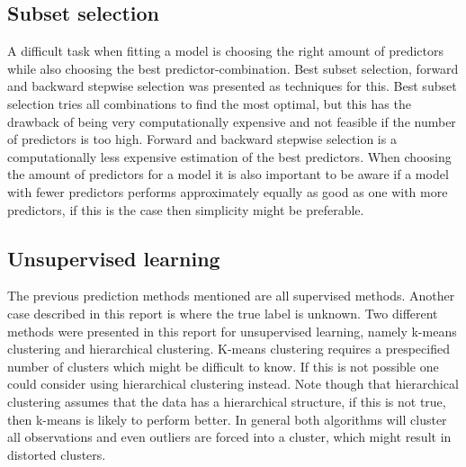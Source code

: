 \subsection{Subset selection}
A difficult task when fitting a model is choosing the right amount of predictors while also choosing the best predictor-combination. Best subset selection, forward and backward stepwise selection was presented as techniques for this. Best subset selection tries all combinations to find the most optimal, but this has the drawback of being very computationally expensive and not feasible if the number of predictors is too high. Forward and backward stepwise selection is a computationally less expensive estimation of the best predictors. When choosing the amount of predictors for a model it is also important to be aware if a model with fewer predictors performs approximately equally as good as one with more predictors, if this is the case then simplicity might be preferable.

\subsection{Unsupervised learning}
The previous prediction methods mentioned are all supervised methods. Another case described in this report is where the true label is unknown. Two different methods were presented in this report for unsupervised learning, namely k-means clustering and hierarchical clustering. K-means clustering requires a prespecified  number of clusters which might be difficult to know. If this is not possible one could consider using hierarchical clustering instead. Note though that hierarchical clustering assumes that the data has a hierarchical structure, if this is not true, then k-means is likely to perform better. In general both algorithms will cluster all observations and even outliers are forced into a cluster, which might result in distorted clusters.